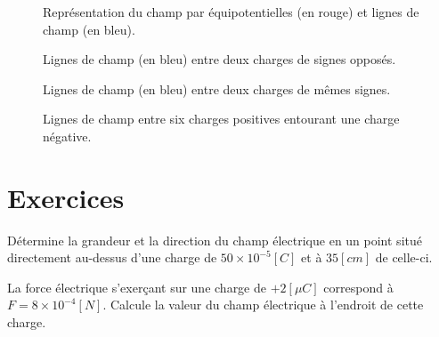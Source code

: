 \begin{figure}[!ht]
    \centering
    \resizebox{.6\linewidth}{!}{}
    \caption{Représentation du champ par équipotentielles (en rouge) et lignes de champ (en bleu).}
    \label{equipotentielle}
\end{figure}

\newpage

\begin{figure}[!ht]
    \centering
    \begin{minipage}[b]{.49\linewidth}
        \centering
        \resizebox{\linewidth}{!}{}
        \caption{Lignes de champ (en bleu) entre deux charges de signes opposés.}
        \label{champ_pos_neg}
    \end{minipage}
    \begin{minipage}[b]{.49\linewidth}
        \centering
        \resizebox{\linewidth}{!}{}
        \caption{Lignes de champ (en bleu) entre deux charges de mêmes signes.}
        \label{champ_pos_pos}
    \end{minipage}
\end{figure}



\begin{figure}[!ht]
    \centering
    \resizebox{.7\linewidth}{!}{}
    \caption{Lignes de champ entre six charges positives entourant une charge négative.}
    \label{six_charges}
\end{figure}


\newpage

\section{Exercices}
\begin{exercise}
    Détermine la grandeur et la direction du champ électrique en un point situé directement au-dessus d'une charge de \(50 \times 10^{-5}[C]\) et à \(35[cm]\) de celle-ci.
\end{exercise}

\begin{exercise}
    La force électrique s'exerçant sur une charge de \(+2 [\mu C]\) correspond à \(F=8 \times 10^{-4}[N]\). Calcule la valeur du champ électrique à l'endroit de cette charge.
\end{exercise}

